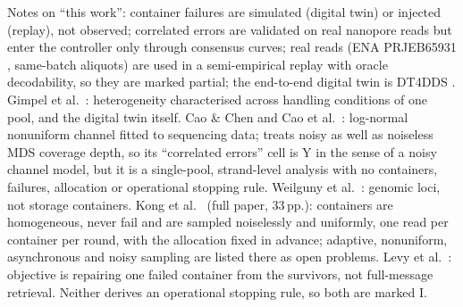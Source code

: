 \begin{table}[!t]
\vspace{2pt}
\parbox{\textwidth}{\scriptsize Notes on ``this work'': container failures are simulated (digital twin) or injected
(replay), not observed; correlated errors are validated on real nanopore reads but enter the controller only through
consensus curves; real reads (ENA PRJEB65931 \cite{gimpel2023prjeb65931}, same-batch aliquots) are used in a
semi-empirical replay with oracle decodability, so they are marked partial; the end-to-end digital twin is DT4DDS
\cite{gimpel2023digital}.  Gimpel et al.\ \cite{gimpel2023digital}: heterogeneity characterised across handling conditions
of one pool, and the digital twin itself.  Cao \& Chen \cite{cao2025optimizing} and Cao et al.\ \cite{cao2026modeling}: log-normal nonuniform
channel fitted to sequencing data; \cite{cao2026modeling} treats noisy as well as noiseless MDS coverage depth, so its
``correlated errors'' cell is Y in the sense of a noisy channel model, but it is a single-pool, strand-level analysis
with no containers, failures, allocation or operational stopping rule.  Weilguny et al.\ \cite{weilguny2023dynamic}: genomic loci, not storage containers.  Kong et al.\
\cite{kong2026coverage} (full paper, 33\,pp.): containers are homogeneous, never fail and are sampled noiselessly and
uniformly, one read per container per round, with the allocation fixed in advance; adaptive, nonuniform, asynchronous
and noisy sampling are listed there as open problems.  Levy et al.\ \cite{levy2026expected}: objective is repairing one
failed container from the survivors, not full-message retrieval.  Neither derives an operational stopping rule, so both
are marked I.}
\end{table}
